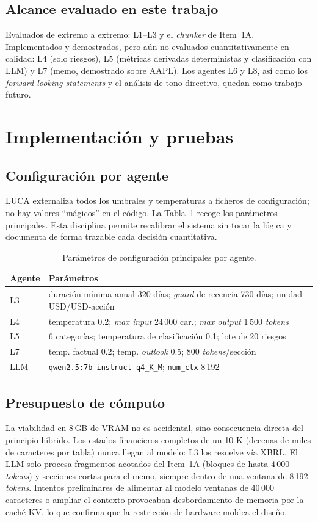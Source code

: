 \documentclass[conference]{IEEEtran}
\begin{document}
\subsection{Alcance evaluado en este trabajo}
Evaluados de extremo a extremo: L1--L3 y el \textit{chunker} de Item~1A.
Implementados y demostrados, pero aún no evaluados cuantitativamente en calidad:
L4 (solo riesgos), L5 (métricas derivadas deterministas y clasificación con LLM)
y L7 (memo, demostrado sobre AAPL). Los agentes L6 y L8, así como los
\textit{forward-looking statements} y el análisis de tono directivo, quedan como
trabajo futuro.

\section{Implementación y pruebas}
\label{sec:impl}
\subsection{Configuración por agente}
LUCA externaliza todos los umbrales y temperaturas a ficheros de configuración;
no hay valores ``mágicos'' en el código. La Tabla~\ref{tab:config} recoge los
parámetros principales. Esta disciplina permite recalibrar el sistema sin tocar
la lógica y documenta de forma trazable cada decisión cuantitativa.

\begin{table}[t]
\centering
\caption{Parámetros de configuración principales por agente.}
\label{tab:config}
\begin{tabular}{lp{}}
\toprule
Agente & Parámetros \\
\midrule
L3 & duración mínima anual 320 días; \textit{guard} de recencia 730 días; unidad USD/USD-acción \\
L4 & temperatura 0.2; \textit{max input} 24\,000 car.; \textit{max output} 1\,500 \textit{tokens} \\
L5 & 6 categorías; temperatura de clasificación 0.1; lote de 20 riesgos \\
L7 & temp. factual 0.2; temp. \textit{outlook} 0.5; 800 \textit{tokens}/sección \\
LLM & \texttt{qwen2.5:7b-instruct-q4\_K\_M}; \texttt{num\_ctx} 8\,192 \\
\bottomrule
\end{tabular}
\end{table}

\subsection{Presupuesto de cómputo}
La viabilidad en 8\,GB de VRAM no es accidental, sino consecuencia directa del
principio híbrido. Los estados financieros completos de un 10-K (decenas de miles
de caracteres por tabla) nunca llegan al modelo: L3 los resuelve vía XBRL. El
LLM solo procesa fragmentos acotados del Item~1A (bloques de hasta 4\,000
\textit{tokens}) y secciones cortas para el memo, siempre dentro de una ventana
de 8\,192 \textit{tokens}. Intentos preliminares de alimentar al modelo ventanas
de 40\,000 caracteres o ampliar el contexto provocaban desbordamiento de memoria
por la caché KV, lo que confirma que la restricción de hardware moldea el diseño.
\end{document}
